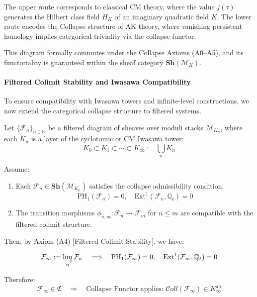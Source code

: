 \documentclass[11pt]{article}
\begin{document}
The upper route corresponds to classical CM theory, where the value \( j(\tau) \) generates the Hilbert class field \( H_K \) of an imaginary quadratic field \( K \).  
The lower route encodes the Collapse structure of AK theory, where vanishing persistent homology implies categorical triviality via the collapse functor.

This diagram formally commutes under the Collapse Axioms (A0–A5), and its functoriality is guaranteed within the sheaf category \( \mathbf{Sh}(\mathcal{M}_K) \).

\medskip

\paragraph{Filtered Colimit Stability and Iwasawa Compatibility}

To ensure compatibility with Iwasawa towers and infinite-level constructions, we now extend the categorical collapse structure to filtered systems.

Let \( \{ \mathcal{F}_n \}_{n \in \mathbb{N}} \) be a filtered diagram of sheaves over moduli stacks \( \mathcal{M}_{K_n} \), where each \( K_n \) is a layer of the cyclotomic or CM Iwasawa tower:
\[
K_0 \subset K_1 \subset \cdots \subset K_\infty := \bigcup_{n} K_n
\]

Assume:
\begin{enumerate}
  \item Each \( \mathcal{F}_n \in \mathbf{Sh}(\mathcal{M}_{K_n}) \) satisfies the collapse admissibility condition:
  \[
  \mathrm{PH}_1(\mathcal{F}_n) = 0,\quad \mathrm{Ext}^1(\mathcal{F}_n, \mathbb{Q}_\ell) = 0
  \]
  \item The transition morphisms \( \phi_{n,m} : \mathcal{F}_n \to \mathcal{F}_m \) for \( n \le m \) are compatible with the filtered colimit structure.
\end{enumerate}

Then, by Axiom (A4) [Filtered Colimit Stability], we have:

\begin{equation}
\label{eq:collapse-colimit}
\mathcal{F}_\infty := \varinjlim_{n} \mathcal{F}_n \quad \Longrightarrow \quad
\mathrm{PH}_1(\mathcal{F}_\infty) = 0,\quad \mathrm{Ext}^1(\mathcal{F}_\infty, \mathbb{Q}_\ell) = 0
\end{equation}

Therefore:
\[
\mathcal{F}_\infty \in \mathfrak{C} \quad \Rightarrow \quad \text{Collapse Functor applies: } \mathcal{C}oll(\mathcal{F}_\infty) \in K_\infty^{\mathrm{ab}}
\]
\end{document}
